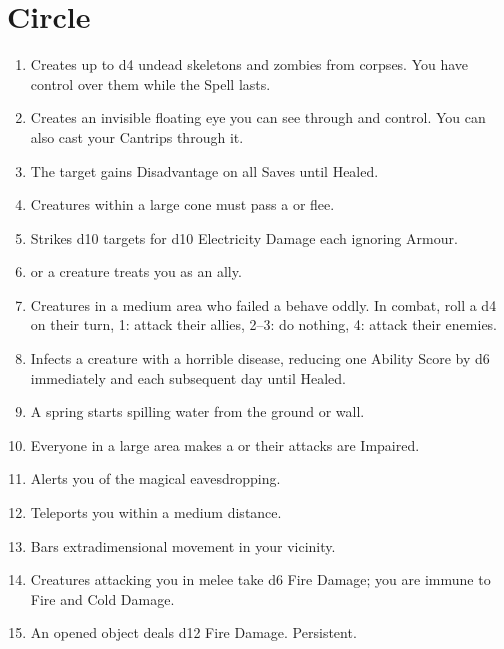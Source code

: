 \documentclass[itdr]{subfiles}
\begin{document}

\vfill
\break

\section{ Circle}
\def \spellcircle {4}
\begin{enumerate}
	\item {} Creates up to d4 undead skeletons and zombies from corpses. You have \mbox{control} over them while the Spell lasts.
	\item {} Creates an invisible floating eye you can see through and control. You can also cast your Cantrips through it.
	\item {} The target gains Disadvantage on all Saves until Healed.
	\item {} Creatures within a large cone must pass a  or flee.
	\item {} Strikes d10 targets for d10 Electricity Damage each ignoring Armour.
	\item {}  or a creature treats you as an ally.
	\item {} Creatures in a medium area who failed a  behave oddly. In combat, roll a d4 on their turn, 1: attack their allies, 2--3: do nothing, 4: attack their enemies.
	\item {} Infects a creature with a \mbox{horrible} disease, reducing one Ability Score by d6 immediately and each subsequent day until Healed.
	\item {} A spring starts spilling water from the ground or wall.
	\item {} Everyone in a large area makes a  or their attacks are Impaired.
	\item {} Alerts you of the magical eavesdropping.
	\item {} Teleports you within a medium distance.
	\item {} Bars extradimensional movement in your vicinity.
	\item {} Creatures attacking you in melee take d6 Fire Damage; you are immune to Fire and Cold Damage.
	\item {} An opened object deals d12 Fire Damage. Persistent.

\end{enumerate}
\end{document}
